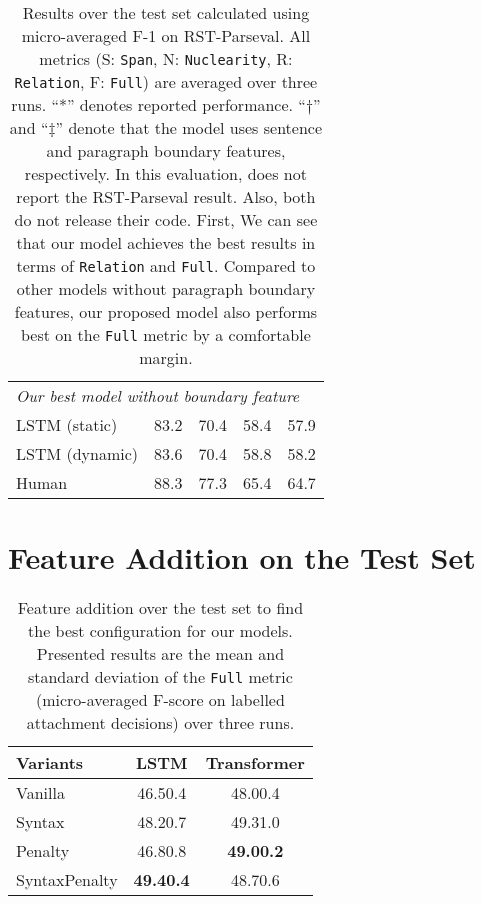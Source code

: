\documentclass[11pt,a4paper]{article}
\newcommand{\sentfeat}{\ensuremath{\dagger}}
\newcommand{\parafeat}{\ensuremath{\ddagger}}
\begin{document}
\begin{table}[h]
\begin{center}
\begin{adjustbox}{max width=0.9\linewidth}
\begin{tabular}{lrrrr}
				\midrule
				\multicolumn{5}{l}{\textit{Our best model without boundary feature}}\\
				LSTM (static) & 83.2 & 70.4 & 58.4 & 57.9 \\
				LSTM (dynamic) & 83.6 & 70.4 & 58.8 & 58.2 \\
				\midrule
				Human & 88.3 & 77.3 & 65.4 & 64.7 \\
				\bottomrule
			\end{tabular}
		\end{adjustbox}
	\end{center}
	\caption{\label{tab:mainresult2} 
		Results over the test set calculated using  micro-averaged F-1 on RST-Parseval.
		All metrics (S: \texttt{Span}, N: \texttt{Nuclearity}, R: \texttt{Relation}, F: \texttt{Full}) are averaged over three runs. ``*'' denotes reported performance. ``\sentfeat'' and ``\parafeat'' denote that the model uses sentence and paragraph boundary features, respectively. In this evaluation, \citet{zhang-etal-2020-top} does not report the RST-Parseval result. 
		Also, both \citet{zhang-etal-2020-top,kobayashi2020top} do not release their code. 
		First, We can see that our model achieves the best results in terms of \texttt{Relation} and \texttt{Full}. Compared to other
		models without paragraph boundary features, our proposed model also
		performs best on the \texttt{Full} metric by a comfortable margin. }
\end{table}


\section{Feature Addition on the Test Set}
\label{sec:appendix_res2}
\begin{table}[h!]
	\begin{center}
		\begin{adjustbox}{max width=0.8\linewidth}
			\begin{tabular}{lcc}
				\toprule
				\textbf{Variants} &  \textbf{LSTM} &
				\textbf{Transformer} \\
				\midrule
				Vanilla &    46.50.4 & 48.00.4 \\
				Syntax &  48.20.7 & 49.31.0  \\
				Penalty & 46.80.8 & \textbf{49.00.2}\\
				SyntaxPenalty &  \textbf{49.40.4} & 48.70.6 \\
				\bottomrule
				
			\end{tabular}
		\end{adjustbox}
	\end{center}
	\caption{Feature addition over the test set to find the best configuration for our models. Presented results are the mean and standard deviation of the \texttt{Full} metric (micro-averaged F-score on labelled attachment decisions) over three runs. }
	\label{tab:analysis_test}
\end{table}
\end{document}
